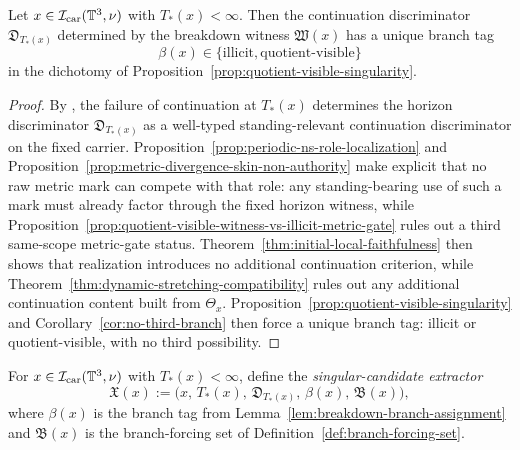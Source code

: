 \begin{lemma}\label{lem:breakdown-branch-assignment}
Let $x\in\mathcal I_{\mathrm{car}}(\mathbb{T}^3,\nu)$ with $T_*(x)<\infty$. Then the continuation discriminator
$\mathfrak D_{T_*(x)}$ determined by the breakdown witness $\mathfrak W(x)$ has a unique branch tag
\[
\beta(x)\in\{\mathrm{illicit},\mathrm{quotient\mbox{-}visible}\}
\]
in the dichotomy of Proposition~\ref{prop:quotient-visible-singularity}.
\end{lemma}

\begin{proof}
By \HorizonDetectabilityRef{}, the failure of continuation at $T_*(x)$ determines the horizon discriminator $\mathfrak D_{T_*(x)}$ as a well-typed standing-relevant continuation discriminator on the fixed carrier. Proposition~\ref{prop:periodic-ns-role-localization} and Proposition~\ref{prop:metric-divergence-skin-non-authority} make explicit that no raw metric mark can compete with that role: any standing-bearing use of such a mark must already factor through the fixed horizon witness, while Proposition~\ref{prop:quotient-visible-witness-vs-illicit-metric-gate} rules out a third same-scope metric-gate status. Theorem~\ref{thm:initial-local-faithfulness} then shows that realization introduces no additional continuation criterion, while Theorem~\ref{thm:dynamic-stretching-compatibility} rules out any additional continuation content built from $\Theta_x$. Proposition~\ref{prop:quotient-visible-singularity} and Corollary~\ref{cor:no-third-branch}
then force a unique branch tag: illicit or quotient-visible, with no third possibility.
\end{proof}

\begin{definition}\label{def:singular-candidate-extractor}
For $x\in\mathcal I_{\mathrm{car}}(\mathbb{T}^3,\nu)$ with $T_*(x)<\infty$, define the \emph{singular-candidate extractor}
\[
\mathfrak X(x):=\bigl(x,\,T_*(x),\,\mathfrak D_{T_*(x)},\,\beta(x),\,\mathfrak B(x)\bigr),
\]
where $\beta(x)$ is the branch tag from Lemma~\ref{lem:breakdown-branch-assignment} and
$\mathfrak B(x)$ is the branch-forcing set of Definition~\ref{def:branch-forcing-set}.
\end{definition}

